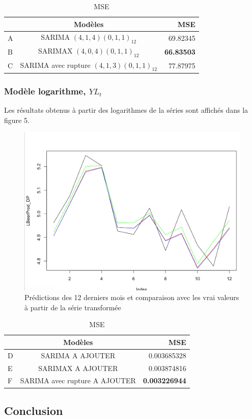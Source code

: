 \documentclass[12pt,a4paper]{book}
\newcommand{\1}{\mathds{1}}
\begin{document}
\begin{table}[h!]
  \begin{center}
    \caption{MSE}
    \label{tab:table1}
    \begin{tabular}{l|c|r} 
      \ & \textbf{Modèles} & \textbf{MSE}\\
      \hline
      A & SARIMA $(4,1,4)(0,1,1)_{12}$ & 69.82345\\
      \rowcolor{LightCyan}
      B & SARIMAX $(4,0,4)(0,1,1)_{12}$& \textbf{66.83503}\\
      C & SARIMA avec rupture $(4,1,3)(0,1,1)_{12}$ & 77.87975\\
    \end{tabular}
  \end{center}
\end{table}


\subsubsection{Modèle logarithme, $YL_t$}
Les résultats obtenus à partir des logarithmes de la séries sont affichés dans la figure 5. 
\begin{figure}[h]
  		\centering
    	\includegraphics[scale=0.4]{Prediction_Log}  
\caption{Prédictions des 12 derniers mois et comparaison avec les vrai valeurs à partir de la série transformée}
\label{fig:1}
\end{figure}

\begin{table}[h!]
  \begin{center}
    \caption{MSE}
    \label{tab:table1}
    \begin{tabular}{l|c|r} 
      \ & \textbf{Modèles} & \textbf{MSE}\\
      \hline
      D & SARIMA A AJOUTER & 0.003685328\\
      E & SARIMAX A AJOUTER & 0.003874816\\
      \rowcolor{LightCyan}
      F & SARIMA avec rupture A AJOUTER & \textbf{0.003226944}\\
    \end{tabular}
  \end{center}
\end{table}

\vspace{5 mm}
\subsection{Conclusion}
\end{document}
